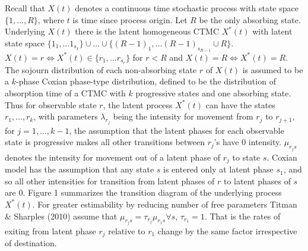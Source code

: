 \documentclass{uwstat572}
\begin{document}
Recall that $X(t)$ denotes a continuous time stochastic process with state space $\{1,\ldots, R\}$, where $t$ is time since process origin. Let $R$ be the only absorbing state. Underlying $X(t)$ there is the latent homogeneous CTMC $X^*(t)$ with latent state space $\{1_1,\ldots1_{s_1}\}\cup \ldots \cup \{(R-1)_1,\ldots (R-1)_{s_{R-1}} \cup R\} $. $X(t)=r \Leftrightarrow X^*(t) \in \{r_1,\ldots r_{s_r}\}$ for $r<R$ and $X(t)=R \Leftrightarrow X^*(t) =R$. The sojourn distribution of each non-absorbing state $r$ of $X(t)$ is assumed to be a $k$-phase Coxian phase-type distribution, defined to be the distribution of absorption time of a CTMC with $k$ progressive states and one absorbing state. Thus for observable state $r$, the latent process $X^* (t)$ can have the states $r_1,\ldots,r_k$,  with parameters $\lambda_{r_j}$ being the intensity for movement from $r_j$ to $r_{j+1}$, for $j=1,\ldots, k-1$, the assumption that the latent phases for each observable state is progressive makes all other transitions between $r_j$'s have $0$ intensity. $\mu_{r_j s}$ denotes the intensity for movement out of a latent phase of $r_j$ to state $s$. Coxian model has the assumption that any state $s$ is entered only at latent phase $s_1$, and so all other intensities for transition from latent phases of $r$ to latent phases of $s$ are $0$. Figure 1 summarizes the transition diagram of the underlying process $X^*(t)$. For greater estimability by reducing number of free parameters Titman \& Sharples (2010) assume that $\mu_{r_j s} = \tau_{r_j} \mu_{r_1 s} \forall s$, $\tau_{r_1}=1$. That is the rates of exiting from latent phase $r_j$ relative to $r_1$ change by the same factor irrespective of destination. 
\end{document}
